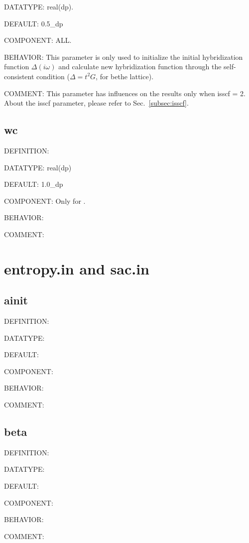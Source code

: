 {\color{green}DATATYPE:} real(dp).

{\color{blue}DEFAULT:} 0.5\_dp

{\color{brown}COMPONENT:} ALL.

{\color{purple}BEHAVIOR:} This parameter is only used to initialize the initial hybridization function $\Delta(i\omega)$ and calculate new hybridization function through the self-consistent condition ($\Delta = t^2 G$, for bethe lattice).

{\color{olive}COMMENT:} This parameter has influences on the results only when isscf = 2. About the isscf parameter, please refer to Sec.~\ref{subsec:isscf}.

\subsection{wc}
{\color{red}DEFINITION:}

{\color{green}DATATYPE:} real(dp)

{\color{blue}DEFAULT:} 1.0\_dp

{\color{brown}COMPONENT:} Only for {\narcissus}.

{\color{purple}BEHAVIOR:}

{\color{olive}COMMENT:}

\section{entropy.in and sac.in}
\subsection{ainit}
{\color{red}DEFINITION:}

{\color{green}DATATYPE:}

{\color{blue}DEFAULT:}

{\color{brown}COMPONENT:}

{\color{purple}BEHAVIOR:}

{\color{olive}COMMENT:}

\subsection{beta}
{\color{red}DEFINITION:}

{\color{green}DATATYPE:}

{\color{blue}DEFAULT:}

{\color{brown}COMPONENT:}

{\color{purple}BEHAVIOR:}

{\color{olive}COMMENT:}

